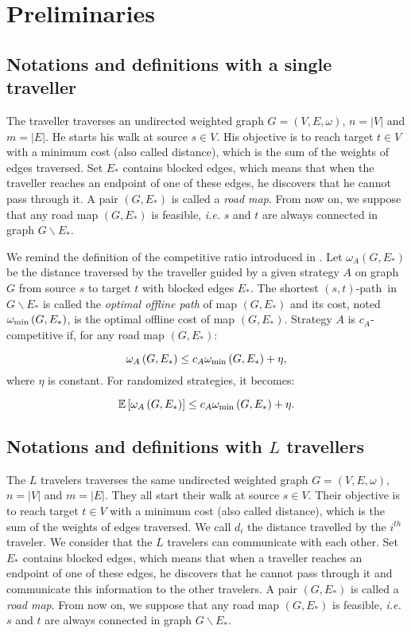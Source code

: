 \documentclass[a4paper, 10pt]{article}
\newcommand{\card}[1]{\left| #1 \right|}
\newcommand{\stpath}{$(s,t)$-path}
\newcommand{\omegamin}{\omega_{\mbox{\scriptsize{min}}}}
\begin{document}
\section{Preliminaries}

\subsection{Notations and definitions with a single traveller} 
The traveller traverses an undirected weighted graph $G=\left(V,E,\omega\right)$, $n = \card{V}$ and $m = \card{E}$. He starts his walk at source $s \in V$. His objective is to reach target $t\in V$ with a minimum cost (also called distance), which is the sum of the weights of edges traversed. Set $E_*$ contains blocked edges, which means that when the traveller reaches an endpoint of one of these edges, he discovers that he cannot pass through it. A pair $\left(G,E_*\right)$ is called a \textit{road map}. From now on, we suppose that any road map $\left(G,E_*\right)$ is feasible, {\em i.e.} $s$ and $t$ are always connected in graph $G\backslash E_*$.

We remind the definition of the competitive ratio introduced in \cite{BoEl98}. Let $\omega_A\left(G,E_*\right)$ be the distance traversed by the traveller guided by a given strategy $A$ on graph $G$ from source $s$ to target $t$ with blocked edges $E_*$. The shortest \stpath ~in $G\backslash E_*$ is called the \textit{optimal offline path} of map $\left(G,E_*\right)$ and its cost, noted $\omegamin\left(G,E_*\right)$, is the optimal offline cost of map $\left(G,E_*\right)$. Strategy $A$ is $c_A$-competitive if, for any road map $\left(G,E_*\right)$:

\[
\omega_A\left(G,E_*\right) \leq c_A\omegamin\left(G,E_*\right) + \eta,
\]
where $\eta$ is constant. For randomized strategies, it becomes:

\[
\mathbb{E}\left[\omega_A\left(G,E_*\right)\right] \leq c_A\omegamin\left(G,E_*\right) + \eta.
\]

\subsection{Notations and definitions with $L$ travellers}

The $L$ travelers traverses the same undirected weighted graph $G=\left(V,E,\omega\right)$, $n = \card{V}$ and $m = \card{E}$. They all start their walk at source $s \in V$. Their objective is to reach target $t\in V$ with a minimum cost (also called distance), which is the sum of the weights of edges traversed. We call $d_i$ the distance travelled by the $i^{th}$ traveler. We consider that the $L$ travelers can communicate with each other. Set $E_*$ contains blocked edges, which means that when a traveller reaches an endpoint of one of these edges, he discovers that he cannot pass through it and communicate this information to the other travelers. A pair $\left(G,E_*\right)$ is called a \textit{road map}. From now on, we suppose that any road map $\left(G,E_*\right)$ is feasible, {\em i.e.} $s$ and $t$ are always connected in graph $G\backslash E_*$.
\end{document}
